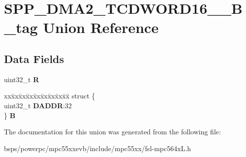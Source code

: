 \hypertarget{unionSPP__DMA2__TCDWORD16____32B__tag}{}\section{S\+P\+P\+\_\+\+D\+M\+A2\+\_\+\+T\+C\+D\+W\+O\+R\+D16\+\_\+\+\_\+B\+\_\+tag Union Reference}
\label{unionSPP__DMA2__TCDWORD16____32B__tag}
\subsection*{Data Fields}
\begin{DoxyCompactItemize}
\item 
\mbox{\label{unionSPP__DMA2__TCDWORD16____32B__tag_adedd2573d9f9ce7f5b7db1241c966e16}} 
uint32\+\_\+t {\bfseries R}
\item 
\mbox{\label{unionSPP__DMA2__TCDWORD16____32B__tag_ada29d0943488f8d20d9d193768988b4c}} 
\begin{tabbing}
xx\=xx\=xx\=xx\=xx\=xx\=xx\=xx\=xx\=\kill
struct \{\\
\>uint32\_t {\bfseries DADDR}:32\\
\} {\bfseries B}\\

\end{tabbing}\end{DoxyCompactItemize}


The documentation for this union was generated from the following file\+:\begin{DoxyCompactItemize}
\item 
bsps/powerpc/mpc55xxevb/include/mpc55xx/fsl-\/mpc564x\+L.\+h\end{DoxyCompactItemize}
